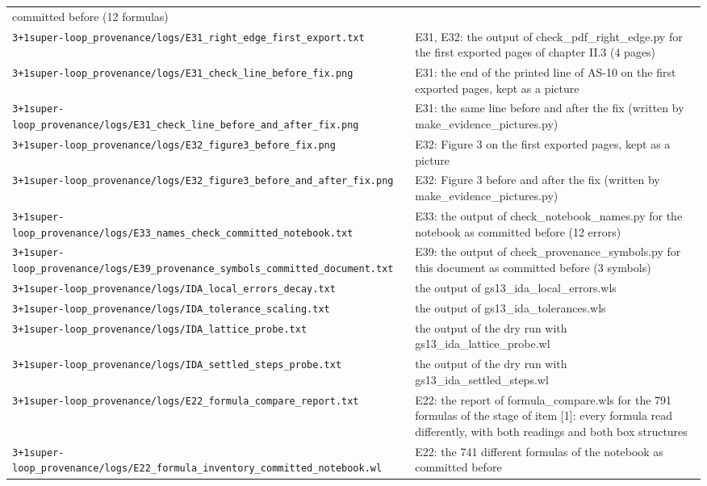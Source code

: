 \documentclass[
  10pt,
]{article}
\begin{document}
\begin{longtable}[]{@{}
  >{\raggedright\arraybackslash}p{}
  >{\raggedright\arraybackslash}p{}@{}}
committed before (12 formulas) \\
\texttt{3+1super-loop\_provenance/logs/E31\_right\_edge\_first\_export.txt}
& E31, E32: the output of check\_pdf\_right\_edge.py for the first
exported pages of chapter II.3 (4 pages) \\
\texttt{3+1super-loop\_provenance/logs/E31\_check\_line\_before\_fix.png}
& E31: the end of the printed line of AS-10 on the first exported pages,
kept as a picture \\
\texttt{3+1super-loop\_provenance/logs/E31\_check\_line\_before\_and\_after\_fix.png}
& E31: the same line before and after the fix (written by
make\_evidence\_pictures.py) \\
\texttt{3+1super-loop\_provenance/logs/E32\_figure3\_before\_fix.png} &
E32: Figure 3 on the first exported pages, kept as a picture \\
\texttt{3+1super-loop\_provenance/logs/E32\_figure3\_before\_and\_after\_fix.png}
& E32: Figure 3 before and after the fix (written by
make\_evidence\_pictures.py) \\
\texttt{3+1super-loop\_provenance/logs/E33\_names\_check\_committed\_notebook.txt}
& E33: the output of check\_notebook\_names.py for the notebook as
committed before (12 errors) \\
\texttt{3+1super-loop\_provenance/logs/E39\_provenance\_symbols\_committed\_document.txt}
& E39: the output of check\_provenance\_symbols.py for this document as
committed before (3 symbols) \\
\texttt{3+1super-loop\_provenance/logs/IDA\_local\_errors\_decay.txt} &
the output of gs13\_ida\_local\_errors.wls \\
\texttt{3+1super-loop\_provenance/logs/IDA\_tolerance\_scaling.txt} &
the output of gs13\_ida\_tolerances.wls \\
\texttt{3+1super-loop\_provenance/logs/IDA\_lattice\_probe.txt} & the
output of the dry run with gs13\_ida\_lattice\_probe.wl \\
\texttt{3+1super-loop\_provenance/logs/IDA\_settled\_steps\_probe.txt} &
the output of the dry run with gs13\_ida\_settled\_steps.wl \\
\texttt{3+1super-loop\_provenance/logs/E22\_formula\_compare\_report.txt}
& E22: the report of formula\_compare.wls for the 791 formulas of the
stage of item {[}1{]}: every formula read differently, with both
readings and both box structures \\
\texttt{3+1super-loop\_provenance/logs/E22\_formula\_inventory\_committed\_notebook.wl}
& E22: the 741 different formulas of the notebook as committed before

\end{longtable}
\end{document}
